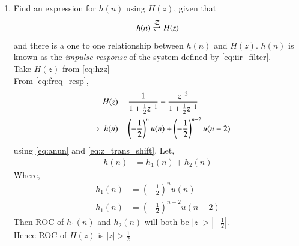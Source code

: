 \documentclass[journal,12pt,twocolumn]{IEEEtran}
\renewcommand\thesection{\arabic{section}}
\begin{document}
\begin{enumerate}[label=\thesection.\arabic*]
\item \label{prob:impulse_resp}
Find an expression for $h(n)$ using $H(z)$, given that 
\begin{equation}
\label{eq:impulse_resp}
h(n) \overset{\mathcal{Z}}{ \rightleftharpoons} H(z)
\end{equation}
and there is a one to one relationship between $h(n)$ and $H(z)$. $h(n)$ is known as the {\em impulse response} of the
system defined by \eqref{eq:iir_filter}.\\Take $H(z)$ from \eqref{eq:hzz}
\\
\solution From \eqref{eq:freq_resp},
\begin{align}
H(z) &= \frac{1}{1 + \frac{1}{2}z^{-1}} + \frac{ z^{-2}}{1 + \frac{1}{2}z^{-1}}
\\
\implies h(n) &= \left(-\frac{1}{2}\right)^{n}u(n) + \left(-\frac{1}{2}\right)^{n-2}u(n-2)
\end{align}
using \eqref{eq:anun} and \eqref{eq:z_trans_shift}.
Let,
\begin{align}
h(n) & = h_1(n) + h_2(n)
\end{align}
Where,
\begin{align}
h_1(n) &= \left(-\frac{1}{2}\right)^nu(n)\\
h_1(n) &= \left(-\frac{1}{2}\right)^{n-2}u(n-2)
\end{align}
Then ROC of $h_1(n)$ and $h_2(n)$ will both be $|z|>|-\frac{1}{2}|$.\\
Hence ROC of $H(z)$ is $|z|>\frac{1}{2}$\\


\end{enumerate}
\end{document}
